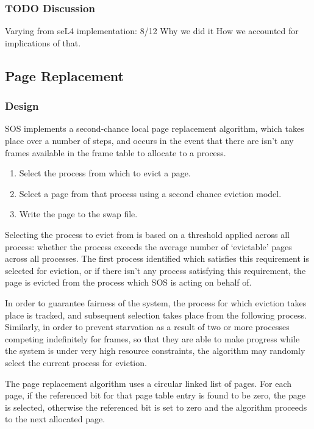 \documentclass[a4paper,12pt]{article}
\begin{document}
\subsubsection{TODO Discussion}
Varying from seL4 implementation: 8/12
Why we did it
How we accounted for implications of that.

\subsection{Page Replacement}
\subsubsection{Design}
SOS implements a second-chance local page replacement algorithm, which takes
place over a number of steps, and occurs in the event that there are isn't any
frames available in the frame table to allocate to a process.

\begin{enumerate}
\item Select the process from which to evict a page.
\item Select a page from that process using a second chance eviction model.
\item Write the page to the swap file.
\end{enumerate}

Selecting the process to evict from is based on a threshold applied across all
process: whether the process exceeds the average number of `evictable' pages
across all processes.  The first process identified which satisfies this
requirement is selected for eviction, or if there isn't any process satisfying
this requirement, the page is evicted from the process which SOS is acting on
behalf of.

In order to guarantee fairness of the system, the process for which eviction
takes place is tracked, and subsequent selection takes place from the
following process.  Similarly, in order to prevent starvation as a result of
two or more processes competing indefinitely for frames, so that they are able
to make progress while the system is under very high resource constraints, the
algorithm may randomly select the current process for eviction.

The page replacement algorithm uses a circular linked list of pages.  For each
page, if the referenced bit for that page table entry is found to be zero, the
page is selected, otherwise the referenced bit is set to zero and the
algorithm proceeds to the next allocated page.
\end{document}
